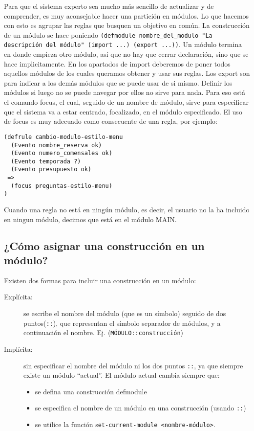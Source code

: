 \documentclass[11pt,svgnames]{scrbook}
\begin{document}
Para que el sistema experto sea mucho más sencillo de actualizar y de
comprender, es muy aconsejable hacer una partición en módulos. Lo que hacemos
con esto es agrupar las reglas que busquen un objetivo en común. La construcción
de un módulo se hace poniendo \texttt{(defmodule nombre\_del\_modulo "La
descripción del módulo"  (import ...) (export ...))}. Un módulo termina en
donde empieza otro módulo, así que no hay que cerrar declaración, sino que se
hace implicitamente. En los apartados de import deberemos de poner todos
aquellos módulos de los cuales queramos obtener y usar sus reglas. Los export
son para indicar a los demás módulos que se puede usar de si mismo. Definir los
módulos si luego no se puede navegar por ellos no sirve para nada. Para eso está
el comando focus, el cual, seguido de un nombre de módulo, sirve para
especificar que el sistema va a estar centrado, focalizado, en el módulo
especificado. El uso de focus es muy adecuado como consecuente de una regla, por
ejemplo:

\begin{verbatim}
(defrule cambio-modulo-estilo-menu
  (Evento nombre_reserva ok)
  (Evento numero_comensales ok)
  (Evento temporada ?)
  (Evento presupuesto ok)
 =>
  (focus preguntas-estilo-menu)
)
\end{verbatim}

Cuando una regla no está en ningún módulo, es decir, el usuario no la ha incluido en ningun módulo, decimos que está en el módulo MAIN.


\subsection{¿Cómo asignar una construcción en un módulo?}

Existen dos formas para incluir una construcción en un módulo:
\begin{description}
 \item[Explícita:]
 se escribe el nombre del módulo (que es un símbolo) seguido de dos puntos(\texttt{::}), que
 representan el símbolo separador de módulos, y a continuación el nombre. Ej.
 (\texttt{MÓDULO::construcción})

\item [Implícita:] sin especificar el nombre del módulo ni los dos puntos \texttt{::}, ya que siempre existe un módulo ``actual''. El módulo actual cambia siempre que:
\begin{itemize}
 \item se defina una construcción defmodule
\item se especifica el nombre de un módulo en una construcción (usando \texttt{::})
\item se utilice la función s\texttt{et-current-module <nombre-módulo>}.
\end{itemize}
\end{description}
\end{document}
